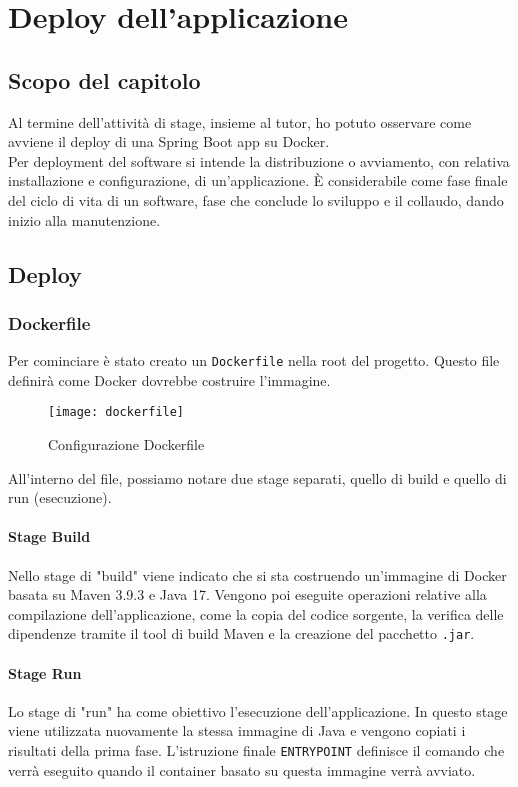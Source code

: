 \chapter{Deploy dell'applicazione}
\label{cap:deploy}
\section{Scopo del capitolo}
Al termine dell'attività di stage, insieme al tutor, ho potuto osservare come avviene il deploy di una Spring Boot app su Docker.\\
Per deployment del software si intende la distribuzione o avviamento, con relativa installazione e configurazione, di un'applicazione. È considerabile come fase finale del ciclo di vita di un software, fase che conclude lo sviluppo e il collaudo, dando inizio alla manutenzione.
\section{Deploy}
\subsection{Dockerfile}
Per cominciare è stato creato un \texttt{Dockerfile} nella root del progetto. Questo file definirà come Docker dovrebbe costruire l'immagine.
\begin{figure}[H] 
    \centering 
    \texttt{[image: dockerfile]} 
    \caption{Configurazione Dockerfile}
\end{figure}
\noindent All'interno del file, possiamo notare due stage separati, quello di build e quello di run (esecuzione).
\subsubsection*{Stage Build}
Nello stage di "build" viene indicato che si sta costruendo un'immagine di Docker basata su Maven 3.9.3 e Java 17. Vengono poi eseguite operazioni relative alla compilazione dell'applicazione, come la copia del codice sorgente, la verifica delle dipendenze tramite il tool di build Maven e la creazione del pacchetto \texttt{.jar}.
\subsubsection*{Stage Run}
Lo stage di "run" ha come obiettivo l'esecuzione dell'applicazione. In questo stage viene utilizzata nuovamente la stessa immagine di Java e vengono copiati i risultati della prima fase. L'istruzione finale \texttt{ENTRYPOINT} definisce il comando che verrà eseguito quando il container basato su questa immagine verrà avviato.
